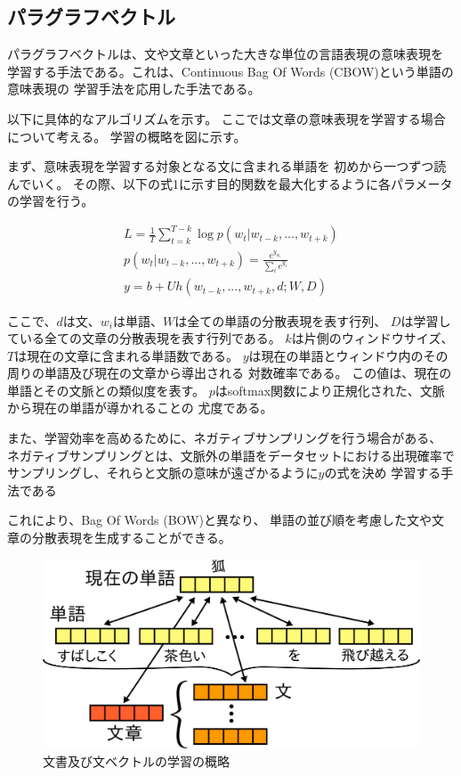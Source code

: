 \documentclass{ttithesis}
\begin{document}
\subsection{パラグラフベクトル}

パラグラフベクトルは、文や文章といった大きな単位の言語表現の意味表現を
学習する手法である。これは、Continuous Bag Of Words
(CBOW)という単語の意味表現の 学習手法を応用した手法である。

以下に具体的なアルゴリズムを示す。
ここでは文章の意味表現を学習する場合について考える。
学習の概略を図\label{fig:ParagraphVector}に示す。

まず、意味表現を学習する対象となる文に含まれる単語を
初めから一つずつ読んでいく。
その際、以下の式1に示す目的関数を最大化するように各パラメータの学習を行う。

\begin{gather}
  L = \frac{1}{T} \sum^{T - k}_{t = k} \log p(w_t | w_{t-k}, ..., w_{t+k}) \\
  p(w_t | w_{t-k}, ..., w_{t+k}) = \frac{e^{y_{w_t}}}{\sum_i e^{y_i}} \\
  y = b + Uh(w_{t-k}, ..., w_{t+k}, d; W, D)
\end{gather}

ここで、$d$は文、$w_i$は単語、$W$は全ての単語の分散表現を表す行列、
$D$は学習している全ての文章の分散表現を表す行列である。
$k$は片側のウィンドウサイズ、
$T$は現在の文章に含まれる単語数である。
$y$は現在の単語とウィンドウ内のその周りの単語及び現在の文章から導出される
対数確率である。 この値は、現在の単語とその文脈との類似度を表す。
$p$はsoftmax関数により正規化された、文脈から現在の単語が導かれることの
尤度である。

また、学習効率を高めるために、ネガティブサンプリングを行う場合がある、
ネガティブサンプリングとは、文脈外の単語をデータセットにおける出現確率で
サンプリングし、それらと文脈の意味が遠ざかるように$y$の式を決め
学習する手法である

これにより、Bag Of Words (BOW)と異なり、
単語の並び順を考慮した文や文章の分散表現を生成することができる。

\begin{figure}\label{fig:ParagraphVector}
  \includegraphics{fig/dvsvwv.png}
  \caption{文書及び文ベクトルの学習の概略}
\end{figure}
\end{document}

